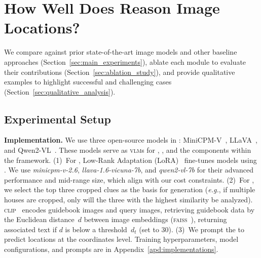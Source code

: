 \section{How Well Does \modelname Reason Image Locations?}

We compare \modelname against prior state-of-the-art image \geoloc models and other baseline approaches (Section~\ref{sec:main_experiments}), ablate each module to evaluate their contributions (Section~\ref{sec:ablation_study}), and provide qualitative examples to highlight successful and challenging cases (Section~\ref{sec:qualitative_analysis}). 


\subsection{Experimental Setup}

\textbf{Implementation.} We use three open-source models in \modelname: \mbox{MiniCPM-V~\cite{yao2024minicpm}}, LLaVA~\cite{liu2024llavanext}, and \mbox{Qwen2-VL}~\cite{Qwen2VL}. These models serve as \textsc{vlm}s for \macname, \micname, and the \guessname components within the \modelname framework. (1)~For \macname, Low-Rank Adaptation (LoRA)~\cite{hu2021lora} fine-tunes models using \dataname. We use \mbox{\textit{minicpm-v-2.6}}, \mbox{\textit{llava-1.6-vicuna-7b}}, and \mbox{\textit{qwen2-vl-7b}} for their advanced performance and mid-range size, which align with our cost constraints.
(2)~For \micname, we select the top three cropped clues as the basis for generation (\textit{e.g.}, if multiple houses are cropped, only will the three with the highest similarity be analyzed). \textsc{clip}~\cite{radford2021learning} encodes guidebook images and query images, retrieving guidebook data by the Euclidean distance~\(d\) between image embeddings (\textsc{faiss}~\cite{johnson2019billion}), returning associated text if \(d\) is below a threshold~$d_t$ (set to 30). 
(3)~We prompt the \guessname to predict locations at the coordinates level. Training hyperparameters, model configurations, and prompts are in Appendix~\ref{apd:implementations}.


